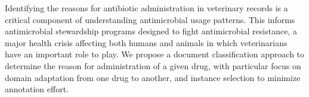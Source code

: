Identifying the reasons for antibiotic administration in veterinary records is a critical component of understanding antimicrobial usage patterns.  This informs antimicrobial stewardship programs designed to fight antimicrobial resistance, a major health crisis affecting both humans and animals in which veterinarians have an important role to play.  We propose a document classification approach to determine the reason for administration of a given drug, with particular focus on domain adaptation from one drug to another, and instance selection to minimize annotation effort.
